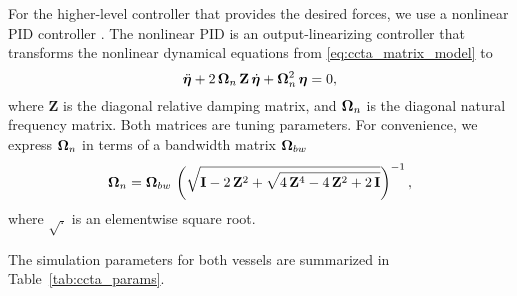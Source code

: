 For the higher-level controller that provides the desired forces, we use a nonlinear PID controller \cite{fossen_handbook_2011}.
The nonlinear PID is an output-linearizing controller that transforms the nonlinear dynamical equations from \eqref{eq:ccta_matrix_model} to
\vspace{-1mm}
\begin{equation}
    \ddot{\bm{\eta}} + 2\,\bm{\Omega}_n\,\mathbf{Z}\,\dot{\bm{\eta}} + \bm{\Omega}_n^2\,\bm{\eta} = 0,
\end{equation}
where $\mathbf{Z}$ is the diagonal relative damping matrix, and $\bm{\Omega}_n$ is the diagonal natural frequency matrix.
Both matrices are tuning parameters.
For convenience, we express $\bm{\Omega}_n$ in terms of a bandwidth matrix $\bm{\Omega}_{bw}$
\vspace{-1mm}
\begin{equation}
    \bm{\Omega}_n = \bm{\Omega}_{bw} \, \left(\sqrt{\mathbf{I} - 2\,\mathbf{Z}^2 + \sqrt{4\,\mathbf{Z}^4 - 4\,\mathbf{Z}^2 + 2\,\mathbf{I}}}\right)^{-1},
\end{equation}
where $\sqrt{.}$ is an elementwise square root.

The simulation parameters for both vessels are summarized in Table~\ref{tab:ccta_params}.

